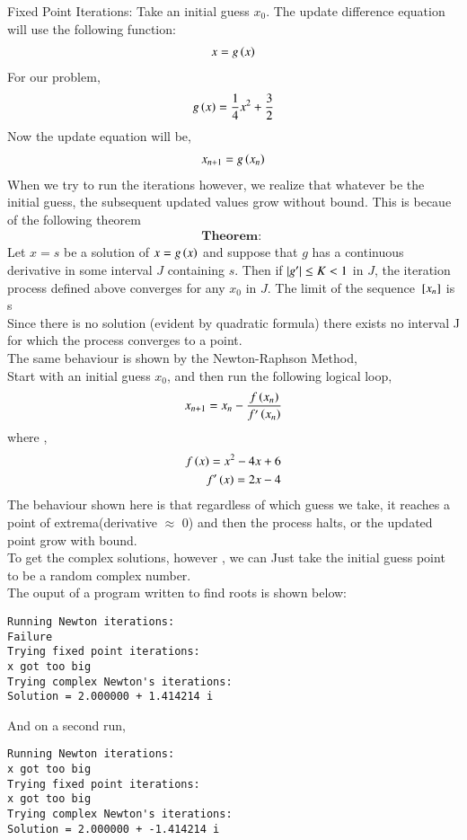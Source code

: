 \documentclass[journal]{IEEEtran}
\begin{document}
Fixed Point Iterations:
Take an initial guess $x_0$. The update difference equation will use the following function:
\begin{align}
    x = g\left(x\right)
\end{align}
For our problem,
\begin{align}
    g\left(x\right) = \frac{1}{4}x^2 + \frac{3}{2}
\end{align}
Now the update equation will be,
\begin{align}
    x_{n+1} = g\left(x_n\right) 
\end{align}
When we try to run the iterations however, we realize that whatever be the initial guess, 
the subsequent updated values grow without bound. This is becaue of the following theorem\\
\begin{align}
    \textbf{Theorem: }
\end{align}
    Let $x = s$ be a solution of $x = g\left(x\right)$ and suppose that $g$ has a continuous
    derivative in some interval $J$ containing $s$. Then if $\left\vert g^{\prime}\right\vert \le K < 1$ in $J$,
    the iteration process defined  above converges for any $x_0$ in $J$. The limit of the sequence
    ${}\left[x_n\right]$ is s\\
\newline
Since there is no solution (evident by quadratic formula) there exists no interval J for which
the process converges to a point.\\
\newline
The same behaviour is shown by the Newton-Raphson Method,\\
Start with an initial guess $x_0$, and then run the following logical loop,
\begin{align}
    x_{n+1} = x_n - \frac{f\left(x_n\right)}{f^{\prime}\left(x_n\right)} 
\end{align}
where ,
\begin{align}
    f\left(x\right) = x^2 - 4x + 6\\
    f^{\prime}\left(x\right) = 2x-4
\end{align}
\newline
The behaviour shown here is that regardless of which guess we take, it reaches a point of 
extrema(derivative $\approx$ 0) and then the process halts, or the updated point grow with bound.\\
To get the complex solutions, however , we can Just take the initial guess point to be a 
random complex number.\\
The ouput of a program written to find roots is shown below:
\begin{verbatim}
Running Newton iterations:
Failure
Trying fixed point iterations:
x got too big
Trying complex Newton's iterations:
Solution = 2.000000 + 1.414214 i
\end{verbatim}
And on a second run, 
\begin{verbatim}
Running Newton iterations:
x got too big
Trying fixed point iterations:
x got too big
Trying complex Newton's iterations:
Solution = 2.000000 + -1.414214 i
\end{verbatim}
\end{document}
